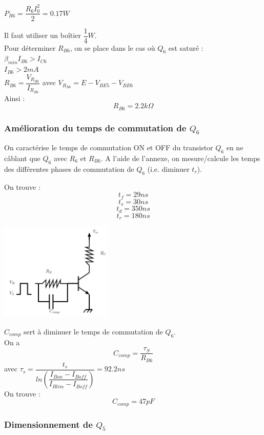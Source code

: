 \documentclass[a4paper]{report}
\begin{document}
$P_{R6} = \dfrac{R_6 I_0^{2}}{2} = 0.17 W$

Il faut utiliser un boîtier $\dfrac{1}{4}W.$\\

Pour déterminer $R_{B6}$, on se place dans le cas où $Q_6$ est saturé :\\
$\beta_{min} I_{B6} > I_{C6}$\\
$I_{B6} > 2mA$\\
$R_{B6} = \dfrac{V_{R_{B6}}}{I_{R_{B6}}}$ avec $V_{R_{B6}} = E - V_{BE5} - V_{BE6}$\\
Ainsi : $$R_{B6} = 2.2k\Omega$$

\subsubsection{Amélioration du temps de commutation de $Q_6$}
On caractérise le temps de commutation ON et OFF du transistor $Q_6$ en ne câblant que $Q_6$ avec $R_6$ et $R_{B6}$. A l'aide de l'annexe, on mesure/calcule les temps des différentes phases de commutation de $Q_6$ (i.e. diminuer $t_r$).

On trouve :
$$t_f = 29ns$$
$$t_s = 30ns$$
$$t_d = 350ns$$
$$t_r = 180ns$$

\begin{center}
\includegraphics[width=0.4\textwidth]{commutation_Q6.PNG}
%
%
\end{center}

$C_{comp}$ sert à diminuer le temps de commutation de $Q_6$.\\
On a $$C_{comp} = \dfrac{\tau_S}{R_{B6}}$$
avec $\tau_s = \dfrac{t_s}{ln(\dfrac{I_{Bon}-I_{Boff}}{I_{Blim}-I_{Boff}})} = 92.2ns$\\

On trouve : $$C_{comp} = 47pF$$

\subsubsection{Dimensionnement de $Q_5$}
\end{document}
